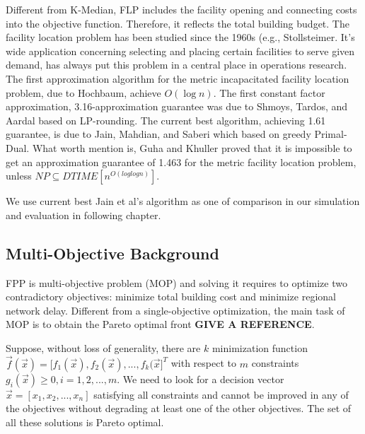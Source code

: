 \documentclass[10pt,journal,compsoc]{IEEEtran}
\begin{document}

Different from K-Median, FLP includes the facility opening and connecting costs into the objective function. Therefore, it reflects the total building budget. The facility location problem has been studied since the 1960s (e.g., Stollsteimer\cite{doi:10.2307/1235442}. It's wide application concerning selecting and placing certain facilities to serve given demand, has always put this problem in a central place in operations research. The first approximation algorithm for the metric incapacitated facility location problem, due to Hochbaum\cite{Hochbaum1982}, achieve $O(\log{}n)$. The first constant factor approximation, 3.16-approximation guarantee was due to Shmoys, Tardos, and Aardal \cite{Shmoys:1997} based on LP-rounding. The current best algorithm, achieving 1.61 guarantee, is due to Jain, Mahdian, and Saberi \cite{Jain:2002}which based on greedy Primal-Dual. What worth mention is, Guha and Khuller \cite{1.43} proved that it is impossible to get an approximation guarantee of 1.463 for the metric facility location problem, unless $NP \subseteq DTIME[n^{O(log{}log{}n)}]$. 

We use current best Jain et al's algorithm as one of comparison in our simulation and evaluation in following chapter.


\subsection{Multi-Objective Background}
FPP is multi-objective problem (MOP) and solving it requires to optimize two contradictory objectives: minimize total building cost and minimize regional network delay. Different from a single-objective optimization, the main task of MOP is to obtain the Pareto optimal front {\bf{GIVE A REFERENCE}}. 

Suppose, without loss of generality, there are $k$ minimization function $\vec{f}(\vec{x}) = \Big[ f_1(\vec{x}),f_2(\vec{x}), ... , f_k(\vec{x} \Big]^T$ with respect to $m$ constraints $g_i(\vec{x}) \geq 0, i=1,2,..., m$. We need to look for a decision vector $\vec{x} = [x_1, x_2, ..., x_n]$ satisfying all constraints and cannot be improved in any of the objectives without degrading at least one of the other objectives. The set of all these solutions is Pareto optimal.\\
\end{document}
